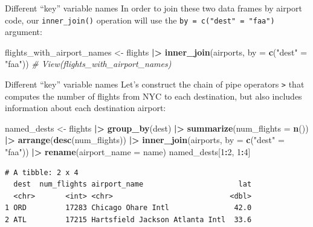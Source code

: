 \documentclass[
  ignorenonframetext,
]{beamer}
\newenvironment{Shaded}{\begin{snugshade}}{\end{snugshade}}
\newcommand{\AttributeTok}[1]{\textcolor[rgb]{0.13,0.29,0.53}{#1}}
\newcommand{\CommentTok}[1]{\textcolor[rgb]{0.56,0.35,0.01}{\textit{#1}}}
\newcommand{\DecValTok}[1]{\textcolor[rgb]{0.00,0.00,0.81}{#1}}
\newcommand{\FunctionTok}[1]{\textcolor[rgb]{0.13,0.29,0.53}{\textbf{#1}}}
\newcommand{\NormalTok}[1]{#1}
\newcommand{\OtherTok}[1]{\textcolor[rgb]{0.56,0.35,0.01}{#1}}
\newcommand{\SpecialCharTok}[1]{\textcolor[rgb]{0.81,0.36,0.00}{\textbf{#1}}}
\newcommand{\StringTok}[1]{\textcolor[rgb]{0.31,0.60,0.02}{#1}}
\begin{document}
\begin{frame}[fragile]{Different ``key'' variable names}
\label{different-key-variable-names-1}
In order to join these two data frames by airport code, our
\texttt{inner\_join()} operation will use the
\texttt{by\ =\ c("dest"\ =\ "faa")} argument:

\normalsize

\begin{Shaded}
\begin{Highlighting}[]
\NormalTok{flights\_with\_airport\_names }\OtherTok{\textless{}{-}}\NormalTok{ flights }\SpecialCharTok{|\textgreater{}} 
  \FunctionTok{inner\_join}\NormalTok{(airports, }\AttributeTok{by =} \FunctionTok{c}\NormalTok{(}\StringTok{"dest"} \OtherTok{=} \StringTok{"faa"}\NormalTok{))}
\CommentTok{\# View(flights\_with\_airport\_names)}
\end{Highlighting}
\end{Shaded}

\normalsize
\end{frame}

\begin{frame}[fragile]{Different ``key'' variable names}
\label{different-key-variable-names-2}
Let's construct the chain of pipe operators
\texttt{\textbar{}\textgreater{}} that computes the number of flights
from NYC to each destination, but also includes information about each
destination airport:

\normalsize

\begin{Shaded}
\begin{Highlighting}[]
\NormalTok{named\_dests }\OtherTok{\textless{}{-}}\NormalTok{ flights }\SpecialCharTok{|\textgreater{}}
  \FunctionTok{group\_by}\NormalTok{(dest) }\SpecialCharTok{|\textgreater{}}
  \FunctionTok{summarize}\NormalTok{(}\AttributeTok{num\_flights =} \FunctionTok{n}\NormalTok{()) }\SpecialCharTok{|\textgreater{}}
  \FunctionTok{arrange}\NormalTok{(}\FunctionTok{desc}\NormalTok{(num\_flights)) }\SpecialCharTok{|\textgreater{}}
  \FunctionTok{inner\_join}\NormalTok{(airports, }\AttributeTok{by =} \FunctionTok{c}\NormalTok{(}\StringTok{"dest"} \OtherTok{=} \StringTok{"faa"}\NormalTok{)) }\SpecialCharTok{|\textgreater{}}
  \FunctionTok{rename}\NormalTok{(}\AttributeTok{airport\_name =}\NormalTok{ name)}
\NormalTok{named\_dests[}\DecValTok{1}\SpecialCharTok{:}\DecValTok{2}\NormalTok{, }\DecValTok{1}\SpecialCharTok{:}\DecValTok{4}\NormalTok{]}
\end{Highlighting}
\end{Shaded}

\begin{verbatim}
# A tibble: 2 x 4
  dest  num_flights airport_name                      lat
  <chr>       <int> <chr>                           <dbl>
1 ORD         17283 Chicago Ohare Intl               42.0
2 ATL         17215 Hartsfield Jackson Atlanta Intl  33.6
\end{verbatim}

\normalsize
\end{frame}
\end{document}

